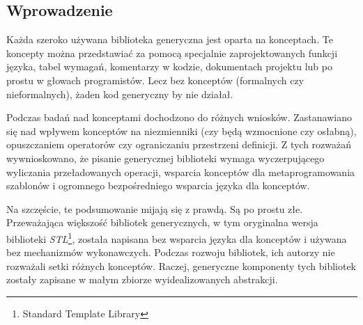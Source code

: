\documentclass[11pt, a4paper]{article}
\begin{document}
\subsection*{Wprowadzenie}

Każda szeroko używana biblioteka generyczna jest oparta na konceptach. Te koncepty można przedstawiać za pomocą specjalnie zaprojektowanych funkcji języka, tabel wymagań, komentarzy w kodzie, dokumentach projektu lub po prostu w głowach programistów. Lecz bez konceptów (formalnych czy nieformalnych), żaden kod generyczny by nie działał.

Podczas badań nad konceptami dochodzono do różnych wniosków. Zastanawiano się nad wpływem konceptów na niezmienniki (czy będą wzmocnione czy osłabną), opuszczaniem operatorów czy ograniczaniu przestrzeni definicji. Z tych rozważań wywnioskowano, że pisanie generycznej biblioteki wymaga wyczerpującego wyliczania przeładowanych operacji, wsparcia konceptów dla metaprogramowania szablonów i ogromnego bezpośredniego wsparcia języka dla konceptów.

Na szczęście, te podsumowanie mijają się z prawdą. Są po prostu złe. Przeważająca większość bibliotek generycznych, w tym oryginalna wersja biblioteki \emph{STL}\footnote{Standard Template Library}, została napisana bez wsparcia języka dla konceptów i używana bez mechanizmów wykonawczych. Podczas rozwoju bibliotek, ich autorzy nie rozważali setki różnych konceptów. Raczej, generyczne komponenty tych bibliotek zostały zapisane w małym zbiorze wyidealizowanych abstrakcji.

\end{document}
